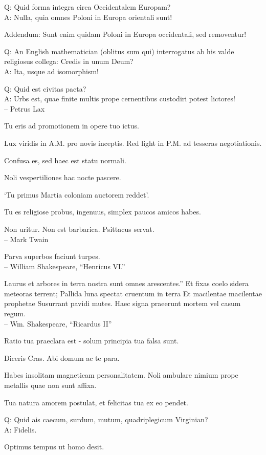\documentclass[titlepage,12pt]{memoir}
\begin{document}
Q: Quid forma integra circa Occidentalem Europam?\\
A: Nulla, quia omnes Poloni in Europa orientali sunt!

Addendum: Sunt enim quidam Poloni in Europa occidentali, sed
removentur!

Q: An English mathematician (oblitus sum qui) interrogatus ab his
valde religiosus collega: Credis in unum Deum?\\
A: Ita, usque ad isomorphism!

Q: Quid est civitas pacta?\\
A: Urbs est, quae finite multis prope cernentibus custodiri potest
lictores!
\\-- Petrus Lax

Tu eris ad promotionem in opere tuo ictus.

Lux viridis in A.M. pro novis inceptis. Red light in P.M. ad tesseras negotiationis.

Confusa es, sed haec est statu normali.

Noli vespertiliones hac nocte pascere.

‘Tu primus Martia coloniam auctorem reddet’.

Tu es religiose probus, ingenuus, simplex
paucos amicos habes.

Non uritur. Non est barbarica. Psittacus servat.
\\-- Mark Twain

Parva superbos faciunt turpes.
\\-- William Shakespeare, “Henricus VI.”

Laurus et arbores in terra nostra sunt omnes arescentes.”
Et fixas coelo sidera meteoras terrent;
Pallida luna spectat cruentum in terra
Et macilentae macilentae prophetae Susurrant pavidi mutes.
Haec signa praeerunt mortem vel casum regum.
\\-- Wm. Shakespeare, “Ricardus II”

Ratio tua praeclara est - solum principia tua falsa sunt.

Diceris Cras. Abi domum ac te para.

Habes insolitam magneticam personalitatem. Noli ambulare nimium prope
metallis quae non sunt affixa.

Tua natura amorem postulat, et felicitas tua ex eo pendet.

Q: Quid ais caecum, surdum, mutum, quadriplegicum Virginian?\\
A: Fidelis.

Optimus tempus ut homo desit.
\end{document}
